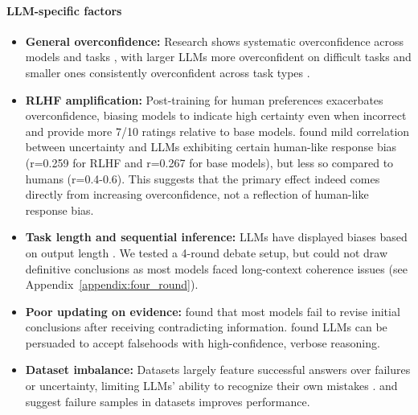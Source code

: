 \documentclass{article}
\begin{document}
\paragraph{LLM-specific factors}
\begin{itemize}
    \item \textbf{General overconfidence:} Research shows systematic overconfidence across models and tasks \citep{chhikara2025mindconfidencegapoverconfidence,xiong2024uncertainty}, with larger LLMs more overconfident on difficult tasks and smaller ones consistently overconfident across task types \citep{wen2024from}.

    \item \textbf{RLHF amplification:} Post-training for human preferences exacerbates overconfidence, biasing models to indicate high certainty even when incorrect \citep{leng2025tamingoverconfidencellmsreward} and provide more 7/10 ratings \citep{west2025basemodelsbeataligned,openai2024gpt4technicalreport} relative to base models. \citet{tjuatja2024llmsexhibithumanlikeresponse} found mild correlation between uncertainty and LLMs exhibiting certain human-like response bias (r=0.259 for RLHF and r=0.267 for base models), but less so compared to humans (r=0.4-0.6). This suggests that the primary effect indeed comes directly from increasing overconfidence, not a reflection of human-like response bias.
    
    \item \textbf{Task length and sequential inference:} LLMs have displayed biases based on output length \citep{liu2025understandingr1zeroliketrainingcritical}. We tested a 4-round debate setup, but could not draw definitive conclusions as most models faced long-context coherence issues (see Appendix~\ref{appendix:four_round}).

    \item \textbf{Poor updating on evidence:} \citet{wilie2024beliefrevisionadaptabilitylarge} found that most models fail to revise initial conclusions after receiving contradicting information. \citet{agarwal2025persuasionoverridestruthmultiagent} found LLMs can be persuaded to accept falsehoods with high-confidence, verbose reasoning.

    \item \textbf{Dataset imbalance:} Datasets largely feature successful answers over failures or uncertainty, limiting LLMs' ability to recognize their own mistakes \citep{zhou2023navigatinggreyareaexpressions}. \citet{chung2025learningfailuresmultiattemptreinforcement} and \cite{stechly2025semanticsunreasonableeffectivenessreasonless} suggest failure samples in datasets improves performance.
\end{itemize}
\end{document}
